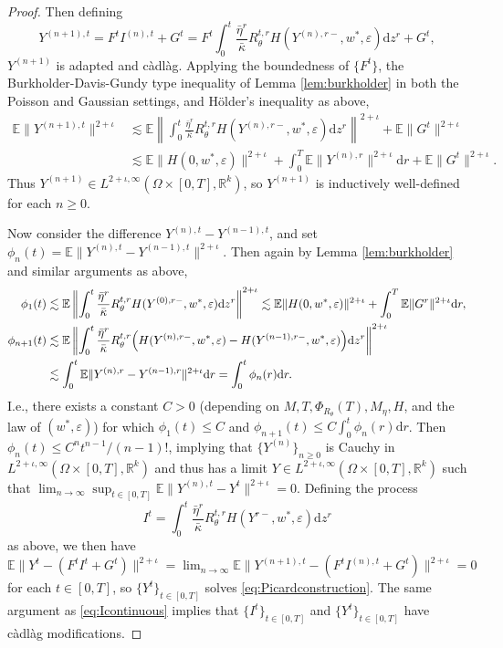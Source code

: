 \documentclass[11pt,letterpaper,reqno]{amsart}
\theoremstyle{definition}
\def\eps{\varepsilon}
\def\d{\mathrm{d}}
\def\E{\mathbb{E}}
\def\R{\mathbb{R}}
\def\Rt{R_\theta}
\def\pRt{\Phi_{\Rt}}
\newcommand{\norm}[1]{\|#1\|}
\begin{document}
\begin{proof}
Then defining
\begin{equation}\label{eq:PicardStepXi}
Y^{(n+1),t}=F^tI^{(n),t}+G^t
=F^t\int_0^t \frac{\bar\eta^r}{\bar\kappa} R_\theta^{t,r}
H(Y^{(n),r-},w^*,\eps)\d z^r+G^t,
\end{equation}
$Y^{(n+1)}$ is adapted and c\`adl\`ag.
Applying the boundedness of $\{F^t\}$, the Burkholder-Davis-Gundy type
inequality of Lemma \ref{lem:burkholder} in both the Poisson and Gaussian
settings, and H\"older's inequality as above,
\begin{align*}
\E \norm{Y^{(n+1),t}}^{2+\iota}
&\lesssim \E \left\|\int_0^t \frac{\bar\eta^r}{\bar\kappa} R_\theta^{t,r}
H(Y^{(n),r-},w^*,\eps)\d z^r\right\|^{2+\iota}
+\E \|G^t\|^{2+\iota}\\
&\lesssim \E\|H(0,w^*,\eps)\|^{2+\iota}
+\int_0^T \E\|Y^{(n),r}\|^{2+\iota}\d r
+\E\|G^t\|^{2+\iota}.
\end{align*}
Thus $Y^{(n+1)} \in L^{2+\iota,\infty}(\Omega \times [0,T],\R^k)$, so
$Y^{(n+1)}$ is inductively well-defined for each $n \geq 0$.

Now consider the difference $Y^{(n),t}-Y^{(n-1),t}$,
and set $\phi_n(t)=\E\|Y^{(n),t}-Y^{(n-1),t}\|^{2+\iota}$.
Then again by Lemma \ref{lem:burkholder} and similar arguments as above,
\begin{align}
\phi_1(t)&\lesssim \E \left\|\int_0^t \frac{\bar\eta^r}{\bar\kappa}
R_\theta^{t,r}H(Y^{(0),r-},w^*,\eps) \d z^r\right\|^{2+\iota}
\lesssim \E\|H(0,w^*,\eps)\|^{2+\iota} +\int_0^T \E \|G^r\|^{2+\iota} \d
r,\notag\\
\phi_{n+1}(t) &\lesssim
\E \left\|\int_0^t \frac{\bar\eta^r}{\bar\kappa}R_{\theta}^{t,r}
\Big(H(Y^{(n),r-},w^*,\eps) - H(Y^{(n-1),r-},w^*,\eps)\Big)
\d z^r\right\|^{2+\iota}\notag\\
&\lesssim\int_0^t \E \|Y^{(n),r}-Y^{(n-1),r}\|^{2+\iota}
\d r=\int_0^t \phi_n(r)\d r.\label{eq:Picardbound}
\end{align}
I.e., there exists a constant $C>0$ (depending on $M,T,\pRt(T),M_\eta,H$,
and the law of $(w^*,\eps)$) for which
$\phi_1(t) \leq C$ and $\phi_{n+1}(t)\leq C\int_0^t \phi_n(r)\d r$.
Then $\phi_{n}(t)\leq C^nt^{n-1}/(n-1)!$, implying that $\{Y^{(n)}\}_{n \geq 0}$
is Cauchy in $L^{2+\iota,\infty}(\Omega \times [0,T],\R^k)$ and thus has a
limit $Y \in L^{2+\iota,\infty}(\Omega \times [0,T],\R^k)$ such that
$\lim_{n \to \infty} \sup_{t \in [0,T]} \E\|Y^{(n),t}-Y^t\|^{2+\iota}=0$. Defining the process
\[I^t=\int_0^t \frac{\bar\eta^r}{\bar\kappa}R_\theta^{t,r}
H(Y^{r-},w^*,\eps)\d z^r\]
as above, we then have $\E\|Y^t-(F^tI^t+G^t)\|^{2+\iota}
=\lim_{n \to \infty} \E\|Y^{(n+1),t}-(F^tI^{(n),t}+G^t)\|^{2+\iota}=0$ for each $t \in [0,T]$,
so $\{Y^t\}_{t \in [0,T]}$ solves \eqref{eq:Picardconstruction}. The
same argument as \eqref{eq:Icontinuous} implies that 
$\{I^t\}_{t \in [0,T]}$ and $\{Y^t\}_{t \in [0,T]}$ have c\`adl\`ag
modifications.


\end{proof}
\end{document}
